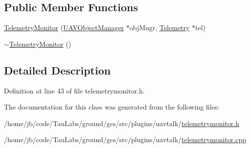 \subsection*{\-Public \-Member \-Functions}
\begin{DoxyCompactItemize}
\item 
\hyperlink{group___u_a_v_talk_plugin_gad2af9cb530ef07a84cc9992d6458111f}{\-Telemetry\-Monitor} (\hyperlink{class_u_a_v_object_manager}{\-U\-A\-V\-Object\-Manager} $\ast$obj\-Mngr, \hyperlink{class_telemetry}{\-Telemetry} $\ast$tel)
\item 
\hyperlink{group___u_a_v_talk_plugin_gabe2f26f1992e78356a82b135aeac951e}{$\sim$\-Telemetry\-Monitor} ()
\end{DoxyCompactItemize}


\subsection{\-Detailed \-Description}


\-Definition at line 43 of file telemetrymonitor.\-h.



\-The documentation for this class was generated from the following files\-:\begin{DoxyCompactItemize}
\item 
/home/jb/code/\-Tau\-Labs/ground/gcs/src/plugins/uavtalk/\hyperlink{telemetrymonitor_8h}{telemetrymonitor.\-h}\item 
/home/jb/code/\-Tau\-Labs/ground/gcs/src/plugins/uavtalk/\hyperlink{telemetrymonitor_8cpp}{telemetrymonitor.\-cpp}\end{DoxyCompactItemize}
